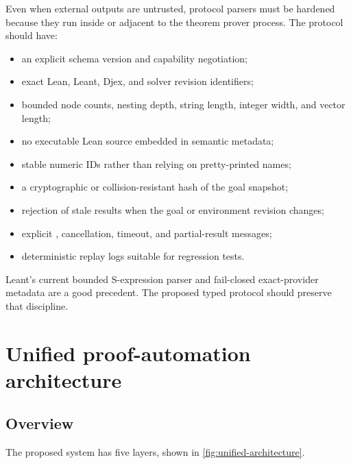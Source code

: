 \documentclass[11pt,letterpaper,openany]{report}
\newcommand{\code}[1]{\texttt{\detokenize{#1}}}
\begin{document}
Even when external outputs are untrusted, protocol parsers must be hardened because
they run inside or adjacent to the theorem prover process. The protocol should have:

\begin{itemize}
  \item an explicit schema version and capability negotiation;
  \item exact Lean, Leant, Djex, and solver revision identifiers;
  \item bounded node counts, nesting depth, string length, integer width, and vector
        length;
  \item no executable Lean source embedded in semantic metadata;
  \item stable numeric IDs rather than relying on pretty-printed names;
  \item a cryptographic or collision-resistant hash of the goal snapshot;
  \item rejection of stale results when the goal or environment revision changes;
  \item explicit \code{unknown}, cancellation, timeout, and partial-result messages;
  \item deterministic replay logs suitable for regression tests.
\end{itemize}

Leant's current bounded S-expression parser and fail-closed exact-provider metadata are
a good precedent. The proposed typed protocol should preserve that discipline.


\chapter{Unified proof-automation architecture}
\label{ch:architecture}

\section{Overview}

The proposed system has five layers, shown in \cref{fig:unified-architecture}.
\end{document}
